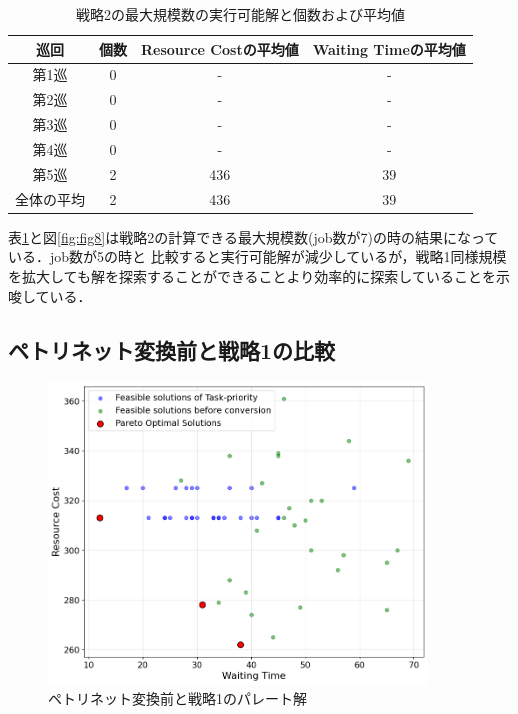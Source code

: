 \begin{table}[ht]
    \centering
    \vspace{-0.3cm}
    \caption{戦略2の最大規模数の実行可能解と個数および平均値}
    \begin{tabular}{|c|c|c|c|}
        \hline
         巡回 & 個数 & Resource Costの平均値 & Waiting Timeの平均値 \\
        \hline
        第1巡 & 0 & - & - \\
        \hline
        第2巡 & 0 & - & - \\
        \hline
        第3巡 & 0 & - & - \\
        \hline
        第4巡 & 0 & - & - \\
        \hline
        第5巡 & 2 & 436 & 39 \\
        \hline
        全体の平均 & 2 & 436 & 39 \\
        \hline
    \end{tabular}
    \label{tab:cost_feasible_max}
\end{table}

表\ref{tab:cost_feasible_max}と図\ref{fig:fig8}は戦略2の計算できる最大規模数(job数が7)の時の結果になっている．job数が5の時と
比較すると実行可能解が減少しているが，戦略1同様規模を拡大しても解を探索することができることより効率的に探索していることを示唆している．

\subsection{ペトリネット変換前と戦略1の比較}
\begin{figure}[H]
    \centering
    \includegraphics[width=0.8\linewidth, height=8cm]{./images/task_and_before_job5.png}
    \caption{ペトリネット変換前と戦略1のパレート解}
    \label{fig:fig9}
\end{figure}

